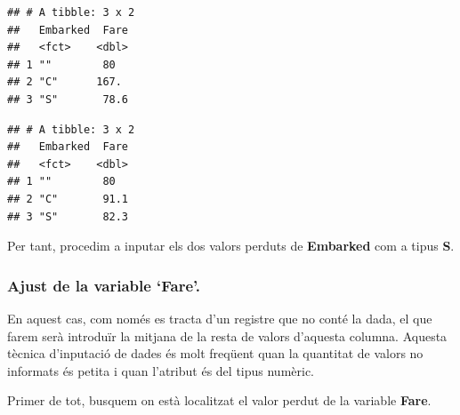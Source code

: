 \documentclass[
]{article}
\newenvironment{Shaded}{\begin{snugshade}}{\end{snugshade}}
\newcommand{\CommentTok}[1]{\textcolor[rgb]{0.50,0.62,0.50}{#1}}
\newcommand{\DecValTok}[1]{\textcolor[rgb]{0.86,0.86,0.80}{#1}}
\newcommand{\FunctionTok}[1]{\textcolor[rgb]{0.94,0.94,0.56}{#1}}
\newcommand{\NormalTok}[1]{\textcolor[rgb]{0.80,0.80,0.80}{#1}}
\newcommand{\OtherTok}[1]{\textcolor[rgb]{0.94,0.94,0.56}{#1}}
\newcommand{\SpecialCharTok}[1]{\textcolor[rgb]{0.86,0.64,0.64}{#1}}
\newcommand{\StringTok}[1]{\textcolor[rgb]{0.80,0.58,0.58}{#1}}
\begin{document}
\begin{verbatim}
## # A tibble: 3 x 2
##   Embarked  Fare
##   <fct>    <dbl>
## 1 ""        80  
## 2 "C"      167. 
## 3 "S"       78.6
\end{verbatim}

\begin{Shaded}
\end{Shaded}

\begin{verbatim}
## # A tibble: 3 x 2
##   Embarked  Fare
##   <fct>    <dbl>
## 1 ""        80  
## 2 "C"       91.1
## 3 "S"       82.3
\end{verbatim}

Per tant, procedim a inputar els dos valors perduts de \textbf{Embarked}
com a tipus \textbf{S}.

\begin{Shaded}
\end{Shaded}

\hypertarget{ajust-de-la-variable-fare.}{%
\subsubsection{Ajust de la variable
`Fare'.}\label{ajust-de-la-variable-fare.}}

En aquest cas, com només es tracta d'un registre que no conté la dada,
el que farem serà introduïr la mitjana de la resta de valors d'aquesta
columna. Aquesta tècnica d'inputació de dades és molt freqüent quan la
quantitat de valors no informats és petita i quan l'atribut és del tipus
numèric.

Primer de tot, busquem on està localitzat el valor perdut de la variable
\textbf{Fare}.
\end{document}
